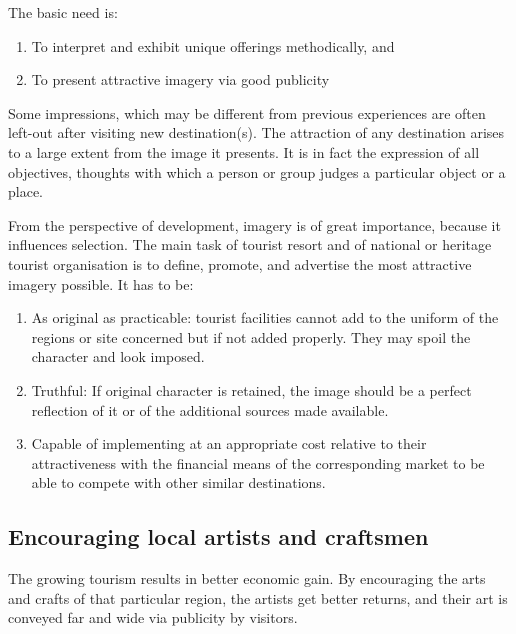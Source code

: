 The basic need is:

\begin{enumerate}
  \item To interpret and exhibit unique offerings methodically, and
  \item To present attractive imagery via good publicity
\end{enumerate}

Some impressions, which may be different from previous experiences are often left-out after visiting new destination(s). The attraction of any destination arises to a large extent from the image it presents. It is in fact the expression of all objectives, thoughts with which a person or group judges a particular object or a place.

From the perspective of development, imagery is of great importance, because it influences selection. The main task of tourist resort and of national or heritage tourist organisation is to define, promote, and advertise the most attractive imagery possible. It has to be:

\begin{enumerate}
  \item As original as practicable: tourist facilities cannot add to the uniform of the regions or site concerned but if not added properly. They may spoil the character and look imposed.
  \item Truthful: If original character is retained, the image should be a perfect reflection of it or of the additional sources made available.
  \item Capable of implementing at an appropriate cost relative to their attractiveness with the financial means of the corresponding market to be able to compete with other similar destinations.
\end{enumerate} 


\subsection{Encouraging local artists and craftsmen} %
\label{sub:encor}

The growing tourism results in better economic gain. By encouraging the arts and crafts of that particular region, the artists get better returns, and their art is conveyed far and wide via publicity by visitors.



